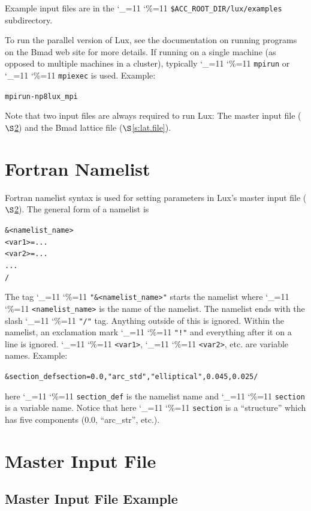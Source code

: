 \documentclass[11pt]{article}
\newcommand{\lux}{Lux\xspace}
\newcommand\ttcmd{\begingroup\catcode`\_=11 \catcode`\%=11 \dottcmd}  %
\newcommand\dottcmd[1]{\texttt{#1}\endgroup}
\newcommand{\vn}{\ttcmd}
\newcommand{\sref}[1]{$\S$\ref{#1}}
\newenvironment{example}
  {\vspace{\ExBeg} \begin{alltt}}
  {\end{alltt} \vspace{\ExEnd}}
\newlength{\ExBeg}
\newlength{\ExEnd}
\begin{document}
Example input files are in the \vn{\$ACC_ROOT_DIR/lux/examples} subdirectory.

To run the parallel version of \lux, see the documentation on running programs on the Bmad web site
for more details. If running on a single machine (as opposed to multiple machines in a cluster),
typically \vn{mpirun} or \vn{mpiexec} is used. Example:
\begin{example}
  mpirun -np 8 lux_mpi
\end{example}

Note that two input files are always required to run \lux: The master input file
(\sref{s:master.file}) and the Bmad lattice file (\sref{s:lat.file}).

\section{Fortran Namelist}
\label{s:namelist}

Fortran namelist syntax is used for setting parameters in \lux's
master input file (\sref{s:master.file}). The general form of a
namelist is
\begin{example}
  &<namelist_name>
    <var1> = ...
    <var2> = ...
    ...
  /
\end{example}
The tag \vn{"\&<namelist_name>"} starts the namelist where
\vn{<namelist_name>} is the name of the namelist. The namelist ends
with the slash \vn{"/"} tag. Anything outside of this is
ignored. Within the namelist, an exclamation mark \vn{"!"} and
everything after it on a line is ignored. \vn{<var1>}, \vn{<var2>},
etc. are variable names. Example:
\begin{example}
  &section_def section =   0.0, "arc_std", "elliptical", 0.045, 0.025 /
\end{example}
here \vn{section_def} is the namelist name and \vn{section} is a variable
name.  Notice that here \vn{section} is a ``structure'' which has five
components (0.0, ``arc_str'', etc.).



\section{Master Input File} 
\label{s:master.file}

\subsection{Master Input File Example}
\label{ss:master.example}
\end{document}
